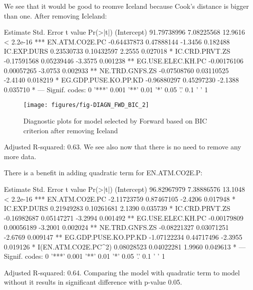 \documentclass[a4paper]{article}
\begin{document}
We see that it would be good to reomve Iceland because Cook's distance is bigger
than one. After removing Icleland:

\begin{Schunk}
\begin{Soutput}
                        Estimate  Std. Error t value  Pr(>|t|)    
(Intercept)          91.79738996  7.08225568 12.9616 < 2.2e-16 ***
EN.ATM.CO2E.PC       -0.64437873  0.47888144 -1.3456  0.182488    
IC.EXP.DURS           0.23530733  0.10432597  2.2555  0.027018 *  
IC.CRD.PRVT.ZS       -0.17591568  0.05239446 -3.3575  0.001238 ** 
EG.USE.ELEC.KH.PC    -0.00176106  0.00057265 -3.0753  0.002933 ** 
NE.TRD.GNFS.ZS       -0.07508760  0.03110525 -2.4140  0.018219 *  
EG.GDP.PUSE.KO.PP.KD -0.96880297  0.45297230 -2.1388  0.035710 *  
---
Signif. codes:  0 '***' 0.001 '**' 0.01 '*' 0.05 '.' 0.1 ' ' 1
\end{Soutput}
\end{Schunk}

\begin{figure}[H]
\begin{center}
\texttt{[image: figures/fig-DIAGN\_FWD\_BIC\_2]}
\caption{Diagnostic plots for model selected by Forward based on BIC criterion after removing Iceland}
\end{center}
\end{figure}
Adjusted R-squared:
0.63. We see also now
that there is no need to remove any more data.

There is a benefit in adding quadratic term for EN.ATM.CO2E.P:
\begin{Schunk}
\begin{Soutput}
                        Estimate  Std. Error t value  Pr(>|t|)    
(Intercept)          96.82967979  7.38886576 13.1048 < 2.2e-16 ***
EN.ATM.CO2E.PC       -2.11723759  0.87467105 -2.4206  0.017948 *  
IC.EXP.DURS           0.21949283  0.10261681  2.1390  0.035739 *  
IC.CRD.PRVT.ZS       -0.16982687  0.05147271 -3.2994  0.001492 ** 
EG.USE.ELEC.KH.PC    -0.00179809  0.00056189 -3.2001  0.002024 ** 
NE.TRD.GNFS.ZS       -0.08221327  0.03071251 -2.6769  0.009147 ** 
EG.GDP.PUSE.KO.PP.KD -1.07122234  0.44717496 -2.3955  0.019126 *  
I(EN.ATM.CO2E.PC^2)   0.08028523  0.04022281  1.9960  0.049613 *  
---
Signif. codes:  0 '***' 0.001 '**' 0.01 '*' 0.05 '.' 0.1 ' ' 1
\end{Soutput}
\end{Schunk}
Adjusted R-squared:
0.64. Comparing the
model with quadratic term to model without it results in significant difference
with p-value 0.05.
\end{document}

